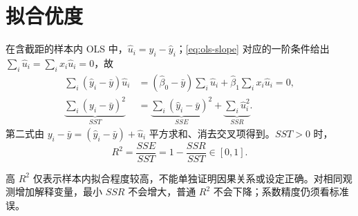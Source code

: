 \section{拟合优度}\label{sec:r-squared}
\label{sec:sst-decomp}
\begin{proofbox}[title=推导]
在含截距的样本内 OLS 中，$\hat u_i=y_i-\hat y_i$；\eqref{eq:ols-slope} 对应的一阶条件给出 $\sum_i\hat u_i=\sum_ix_i\hat u_i=0$，故
\begin{align*}
\sum_i(\hat y_i-\bar y)\hat u_i
&=(\hat\beta_0-\bar y)\sum_i\hat u_i+\hat\beta_1\sum_ix_i\hat u_i=0,\\
\underbrace{\sum_i(y_i-\bar y)^2}_{SST}
&=\underbrace{\sum_i(\hat y_i-\bar y)^2}_{SSE}+\underbrace{\sum_i\hat u_i^2}_{SSR}.
\end{align*}
第二式由 $y_i-\bar y=(\hat y_i-\bar y)+\hat u_i$ 平方求和、消去交叉项得到。$SST>0$ 时，
\begin{equation}
R^2=\frac{SSE}{SST}=1-\frac{SSR}{SST}\in[0,1].\label{eq:r-squared}
\end{equation}
\end{proofbox}
\label{sec:r2-misread}
高 $R^2$ 仅表示样本内拟合程度较高，不能单独证明因果关系或设定正确。对相同观测增加解释变量，最小 $SSR$ 不会增大，普通 $R^2$ 不会下降；系数精度仍须看标准误。
